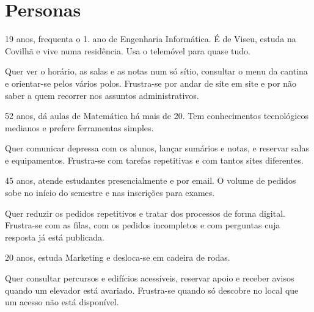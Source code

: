 \documentclass[11pt,a4paper]{article}
\begin{document}
\section{Personas}

\begin{tcolorbox}[caixa, title={Inês Carvalho \textperiodcentered{} estudante}]
  19 anos, frequenta o 1.\textordmasculine{} ano de Engenharia Informática. É de Viseu, estuda na Covilhã e vive numa residência. Usa o telemóvel para quase tudo.

  Quer ver o horário, as salas e as notas num só sítio, consultar o menu da cantina e orientar-se pelos vários polos. Frustra-se por andar de site em site e por não saber a quem recorrer nos assuntos administrativos.
\end{tcolorbox}

\begin{tcolorbox}[caixa, title={Professora Helena Duarte \textperiodcentered{} docente}]
  52 anos, dá aulas de Matemática há mais de 20. Tem conhecimentos tecnológicos medianos e prefere ferramentas simples.

  Quer comunicar depressa com os alunos, lançar sumários e notas, e reservar salas e equipamentos. Frustra-se com tarefas repetitivas e com tantos sites diferentes.
\end{tcolorbox}

\begin{tcolorbox}[caixa, title={Paula Rodrigues \textperiodcentered{} funcionária dos Serviços Académicos}]
  45 anos, atende estudantes presencialmente e por email. O volume de pedidos sobe no início do semestre e nas inscrições para exames.

  Quer reduzir os pedidos repetitivos e tratar dos processos de forma digital. Frustra-se com as filas, com os pedidos incompletos e com perguntas cuja resposta já está publicada.
\end{tcolorbox}

\begin{tcolorbox}[caixa, title={João Almeida \textperiodcentered{} estudante com mobilidade reduzida}]
  20 anos, estuda Marketing e desloca-se em cadeira de rodas.

  Quer consultar percursos e edifícios acessíveis, reservar apoio e receber avisos quando um elevador está avariado. Frustra-se quando só descobre no local que um acesso não está disponível.
\end{tcolorbox}

\end{document}
